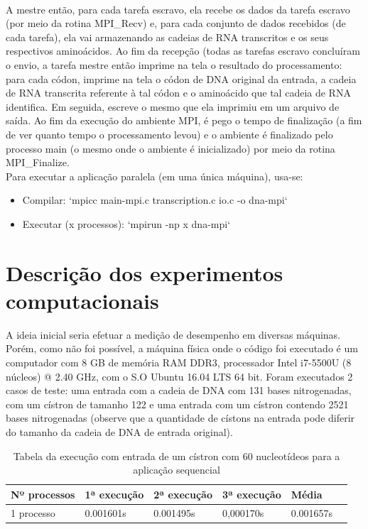 \documentclass[a4paper,10pt]{article}
\begin{document}
\paragraph{} A mestre então, para cada tarefa escravo, ela recebe os dados da tarefa escravo (por meio da rotina MPI\_Recv) e, para cada conjunto de dados recebidos (de cada tarefa), ela vai armazenando as cadeias de RNA transcritos e os seus respectivos aminoácidos. Ao fim da recepção (todas as tarefas escravo concluíram o envio, a tarefa mestre então imprime na tela o resultado do processamento: para cada códon, imprime na tela o códon de DNA original da entrada, a cadeia de RNA transcrita referente à tal códon e o aminoácido que tal cadeia de RNA identifica. Em seguida, escreve o mesmo que ela imprimiu em um arquivo de saída. Ao fim da execução do ambiente MPI, é pego o tempo de finalização (a fim de ver quanto tempo o processamento levou) e o ambiente é finalizado pelo processo main (o mesmo onde o ambiente é inicializado) por meio da rotina MPI\_Finalize.\\

Para executar a aplicação paralela (em uma única máquina), usa-se:
\begin{center}\begin{itemize}\item{Compilar:} `mpicc main-mpi.c transcription.c io.c -o dna-mpi`\\
                     \item{Executar (x processos):} `mpirun -np x dna-mpi`\end{itemize}\end{center}


\section{Descrição dos experimentos computacionais}
A ideia inicial seria efetuar a medição de desempenho em diversas máquinas. Porém, como não foi possível, a máquina física onde o código foi executado é um computador com 8 GB de memória RAM DDR3, processador Intel i7-5500U (8 núcleos) @ 2.40 GHz, com o S.O Ubuntu 16.04 LTS 64 bit.  Foram executados 2 casos de teste: uma entrada com a cadeia de DNA com 131 bases nitrogenadas, com um cístron de tamanho 122 e uma entrada com  um cístron contendo 2521 bases nitrogenadas
(observe que a quantidade de cístons na entrada pode diferir do tamanho da cadeia de DNA de entrada original).

\begin{table}[!htb]
\begin{tabular}{| l | l | l | l | l | p{5cm} |} 
\hline
  Nº processos & 1ª execução & 2ª execução & 3ª execução & Média\\ \hline
1 processo   &	0.001601s   &   0.001495s   & 0,000170s   &  0.001657s\\ \hline

\end{tabular}
\caption{Tabela da execução com entrada de um cístron com 60 nucleotídeos para a aplicação sequencial}
\end{table}
\end{document}
